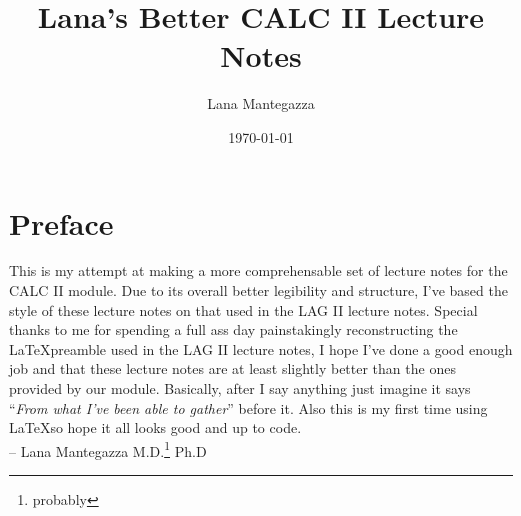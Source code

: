 \documentclass[12pt]{book}
\theoremstyle{definitionstyle}
\numberwithin{equation}{section}
\begin{document}

\title{Lana's Better CALC II Lecture Notes}
\author{Lana Mantegazza}
\date{\today}
\maketitle
\newpage
\setcounter{page}{1}



\chapter*{Preface}
This is my attempt at making a more comprehensable set of lecture notes for the CALC II module. Due to its overall better legibility and structure, I've based the style of these lecture notes on that used in the LAG II lecture notes. Special thanks to me for spending a full ass day painstakingly reconstructing the \LaTeX \space preamble used in the LAG II lecture notes, I hope I've done a good enough job and that these lecture notes are at least slightly better than the ones provided by our module. Basically, after I say anything just imagine it says ``\textit{From what I've been able to gather}'' before it. Also this is my first time using \LaTeX \space so hope it all looks good and up to code.
\\

-- Lana Mantegazza M.D.\footnote{probably} Ph.D\footnotemark[1]


\newpage
\setcounter{page}{1}

\tableofcontents
\end{document}
